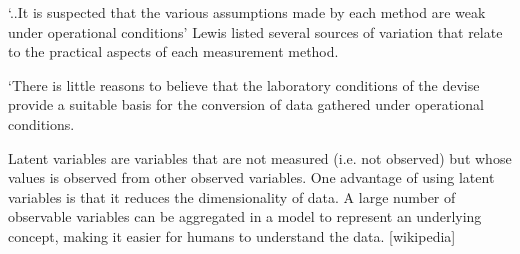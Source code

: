 ‘..It is suspected that the various assumptions made by each method are weak under operational conditions’
Lewis listed several sources of variation that relate to the practical aspects of each measurement method.

‘There is little reasons to believe that the laboratory conditions of the devise provide a suitable basis for the conversion of data gathered under operational conditions.


Latent variables are variables that are not measured (i.e. not observed) but whose values is observed from other observed variables. One advantage of using latent variables is that it reduces the dimensionality of data. A large number of observable variables can be aggregated in a model to represent an underlying concept, making it easier for humans to understand the data.	[wikipedia]



